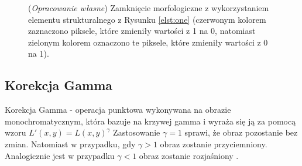 \documentclass{article}
\begin{document}
        \begin{figure}[H]
            \centering
            \qquad
            \qquad
            \caption
            {
                (\textit{Opracowanie własne}) Zamknięcie morfologiczne z wykorzystaniem elementu strukturalnego z Rysunku \ref{elst:one} (czerwonym kolorem zaznaczono piksele, które zmieniły wartości z 1 na 0, natomiast zielonym kolorem oznaczono te piksele, które zmieniły wartości z 0 na 1).
            }
            \label{zamknieciemorfologiczne}
        \end{figure}

        \subsection{Korekcja Gamma}
        {
            \label{sec:korekcja-gamma}
            \Large
            \justifying
            \quad
            Korekcja Gamma - operacja punktowa wykonywana na obrazie monochromatycznym, która bazuje na krzywej gamma i wyraża się ją za pomocą wzoru \(L'(x,y) = L(x,y)^\gamma\)
            Zastosowanie \(\gamma = 1\) sprawi, że obraz pozostanie bez zmian.
            Natomiast w przypadku, gdy \(\gamma > 1\) obraz zostanie przyciemniony.
            Analogicznie jest w przypadku \(\gamma < 1\) obraz zostanie rozjaśniony \cite{Digital Image Processing Second Edition}.
        }
    \newpage
\end{document}
